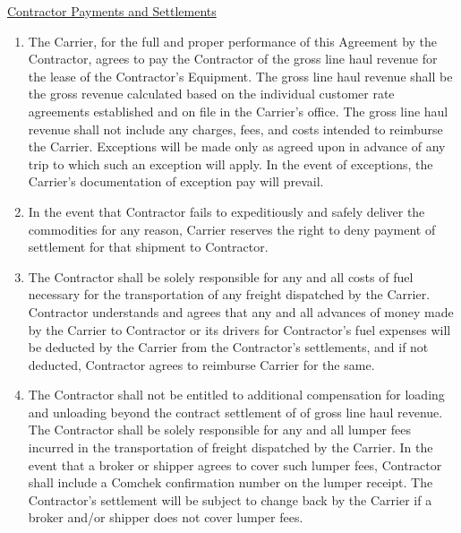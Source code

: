 \underline{Contractor Payments and Settlements}
\begin{enumerate}[ 
    ref = \SecondLevelEnumerator
]
    \item The Carrier, for the full and proper performance of this
    Agreement by the Contractor, agrees to pay the Contractor
    {\bfseries \GrossRevenueCommision} of the gross line haul revenue for
    the lease of the Contractor's Equipment. The gross line haul revenue
    shall be the gross revenue calculated based on the individual customer
    rate agreements established and on file in the Carrier's office. The
    gross line haul revenue shall not include any charges, fees, and costs
    intended to reimburse the Carrier. Exceptions will be made only as
    agreed upon in advance of any trip to which such an exception will
    apply. In the event of exceptions, the Carrier's documentation of
    exception pay will prevail.

    \item In the event that Contractor fails to expeditiously and safely
    deliver the commodities for any reason, Carrier reserves the right to
    deny payment of settlement for that shipment to Contractor.

    \item The Contractor shall be solely responsible for any and all costs
    of fuel necessary for the transportation of any freight dispatched by
    the Carrier. Contractor understands and agrees that any and all
    advances of money made by the Carrier to Contractor or its drivers for
    Contractor's fuel expenses will be deducted by the Carrier from the
    Contractor's settlements, and if not deducted, Contractor agrees to
    reimburse Carrier for the same.

    \item{\label{terms:requirements-and-obligations}} The Contractor shall
    not be entitled to additional compensation for loading and unloading
    beyond the contract settlement of {\bfseries \GrossRevenueCommision} of
    gross line haul revenue. The Contractor shall be solely responsible for
    any and all lumper fees incurred in the transportation of freight
    dispatched by the Carrier. In the event that a broker or shipper agrees
    to cover such lumper fees, Contractor shall include a Comchek
    confirmation number on the lumper receipt. The Contractor's settlement
    will be subject to change back by the Carrier if a broker and/or
    shipper does not cover lumper fees.


\end{enumerate}

